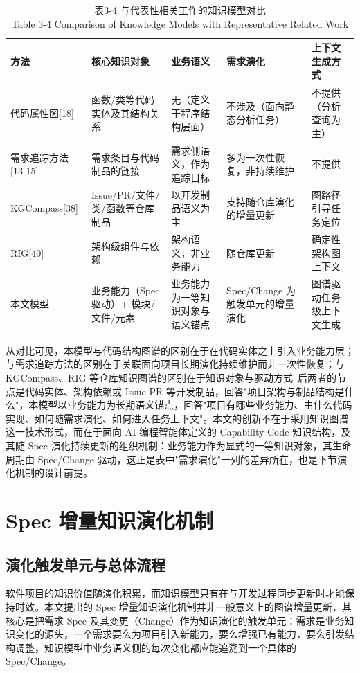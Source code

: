 \begin{table}[htbp]
\centering
\small
\caption{表3-4 与代表性相关工作的知识模型对比\\Table 3-4 Comparison of Knowledge Models with Representative Related Work}
\begin{tabularx}{\textwidth}{|X|X|X|X|X|}
\hline
\textbf{方法} & \textbf{核心知识对象} & \textbf{业务语义} & \textbf{需求演化} & \textbf{上下文生成方式} \\
\hline
代码属性图[18] & 函数/类等代码实体及其结构关系 & 无（定义于程序结构层面） & 不涉及（面向静态分析任务） & 不提供（分析查询为主） \\
需求追踪方法[13-15] & 需求条目与代码制品的链接 & 需求侧语义，作为追踪目标 & 多为一次性恢复，非持续维护 & 不提供 \\
KGCompass[38] & Issue/PR/文件/类/函数等仓库制品 & 以开发制品语义为主 & 支持随仓库演化的增量更新 & 图路径引导任务定位 \\
RIG[40] & 架构级组件与依赖 & 架构语义，非业务能力 & 随仓库更新 & 确定性架构图上下文 \\
本文模型 & 业务能力（Spec 驱动）+ 模块/文件/元素 & 业务能力为一等知识对象与语义锚点 & Spec/Change 为触发单元的增量演化 & 图谱驱动任务级上下文生成 \\
\hline
\end{tabularx}
\end{table}

从对比可见，本模型与代码结构图谱的区别在于在代码实体之上引入业务能力层；与需求追踪方法的区别在于关联面向项目长期演化持续维护而非一次性恢复；与 KGCompass、RIG 等仓库知识图谱的区别在于知识对象与驱动方式--后两者的节点是代码实体、架构依赖或 Issue-PR 等开发制品，回答"项目架构与制品结构是什么"，本模型以业务能力为长期语义锚点，回答"项目有哪些业务能力、由什么代码实现、如何随需求演化、如何进入任务上下文"。本文的创新不在于采用知识图谱这一技术形式，而在于面向 AI 编程智能体定义的 Capability-Code 知识结构，及其随 Spec 演化持续更新的组织机制：业务能力作为显式的一等知识对象，其生命周期由 Spec/Change 驱动，这正是表中"需求演化"一列的差异所在，也是下节演化机制的设计前提。


\section{Spec 增量知识演化机制}

\subsection{演化触发单元与总体流程}
软件项目的知识价值随演化积累，而知识模型只有在与开发过程同步更新时才能保持时效。本文提出的 Spec 增量知识演化机制并非一般意义上的图谱增量更新，其核心是把需求 Spec 及其变更（Change）作为知识演化的触发单元：需求是业务知识变化的源头，一个需求要么为项目引入新能力，要么增强已有能力，要么引发结构调整，知识模型中业务语义侧的每次变化都应能追溯到一个具体的 Spec/Change。

